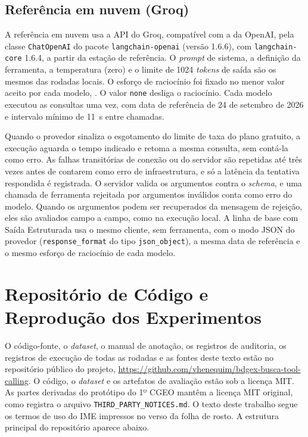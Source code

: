 
\section{Referência em nuvem (Groq)}
\label{apx:specs-groq}

A referência em nuvem usa a API do Groq, compatível com a da OpenAI, pela classe \texttt{ChatOpenAI} do pacote \texttt{langchain-openai} (versão 1.6.6), com \texttt{langchain-core} 1.6.4, a partir da estação de referência. O \textit{prompt} de sistema, a definição da ferramenta, a temperatura (zero) e o limite de 1024 \textit{tokens} de saída são os mesmos das rodadas locais. O esforço de raciocínio foi fixado no menor valor aceito por cada modelo, . O valor \texttt{none} desliga o raciocínio. Cada modelo executou as  consultas uma vez, com data de referência de 24 de setembro de 2026 e intervalo mínimo de 11~s entre chamadas.

Quando o provedor sinaliza o esgotamento do limite de taxa do plano gratuito, a execução aguarda o tempo indicado e retoma a mesma consulta, sem contá-la como erro. As falhas transitórias de conexão ou do servidor são repetidas até três vezes antes de contarem como erro de infraestrutura, e só a latência da tentativa respondida é registrada. O servidor valida os argumentos contra o \textit{schema}, e uma chamada de ferramenta rejeitada por argumentos inválidos conta como erro do modelo. Quando os argumentos podem ser recuperados da mensagem de rejeição, eles são avaliados campo a campo, como na execução local. A linha de base com Saída Estruturada usa o mesmo cliente, sem ferramenta, com o modo JSON do provedor (\texttt{response\_format} do tipo \texttt{json\_object}), a mesma data de referência e o mesmo esforço de raciocínio de cada modelo.

\chapter{Repositório de Código e Reprodução dos Experimentos}
\label{apendice:codigo}

O código-fonte, o \textit{dataset}, o manual de anotação, os registros de auditoria, os registros de execução de todas as rodadas e as fontes deste texto estão no repositório público do projeto, \url{https://github.com/vhenequim/bdgex-busca-tool-calling}. O código, o \textit{dataset} e os artefatos de avaliação estão sob a licença MIT. As partes derivadas do protótipo do 1º CGEO mantêm a licença MIT original, como registra o arquivo \texttt{THIRD\_PARTY\_NOTICES.md}. O texto deste trabalho segue os termos de uso do IME impressos no verso da folha de rosto. A estrutura principal do repositório aparece abaixo.

